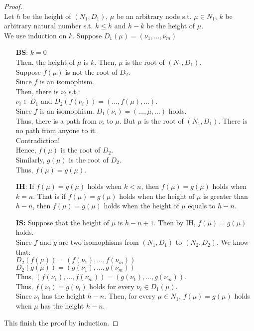 \documentclass[12pt,a4paper]{article}
\theoremstyle{plain}
\begin{document}
\begin{proof}\ \\
    Let $h$ be the height of $( N_1 , D_1 )$, $\mu$ be an arbitrary node s.t. $\mu \in N_1$, $k$ be arbitrary natural number s.t. $k \le h$ and $h - k$ be the height of $\mu$.\\
    We use induction on $k$. Suppose $D_1(\mu)=(\nu_1,...,\nu_m)$
    \begin{itemize}
        \item[\textbf{BS}:]
            $k=0$\\
            Then, the height of $\mu$ is $k$. Then, $\mu$ is the root of $(N_1,D_1)$.\\
            Suppose $f(\mu)$ is not the root of $D_2$.\\
            Since $f$ is an isomophism.\\
            Then, there is $\nu_i$ s.t.:\\
            $\nu_i \in D_1$ and 
            $D_2(f(\nu_i))=(...,f(\mu),...)$.\\ 
            Since $f$ is an isomophism. $D_1(\nu_i)=(...,\mu,...)$ holds.\\
            Thus, there is a path from $\nu_i$ to $\mu$.
            But $\mu$ is the root of $(N_1,D_1)$. There is no path from anyone to it.\\
            Contradiction!\\
            Hence, $f(\mu)$ is the root of $D_2$.\\
            Similarly, $g(\mu)$ is the root of $D_2$.\\
            Thus, $f(\mu)=g(\mu)$.
        \item[\textbf{IH}:]
            If $f(\mu)=g(\mu)$ holds when $k<n$, then $f(\mu)=g(\mu)$ holds when $k=n$. That is if $f(\mu)=g(\mu)$ holds when the height of $\mu$ is greater than $h-n$, then $f(\mu)=g(\mu)$ holds when the height of $\mu$ equals to $h-n$.
        \item[\textbf{IS:}]
            Suppose that the height of $\mu$ is $h-n+1$. Then by IH, $f(\mu)=g(\mu)$ holds.\\
            Since $f$ and $g$ are two isomophisms from $( N_1 , D_1 )$ to $( N_2 , D_2 )$. We know that:\\ 
            $D_2 ( f(\mu)) = ( f(\nu_1) , \dots , f(\nu_m) )$\\
            $D_2 ( g(\mu)) = ( g(\nu_1) , \dots , g(\nu_m) )$\\
            Thus, $( f(\nu_1) , \dots , f(\nu_m) )=( g(\nu_1) , \dots , g(\nu_m) )$.\\
            Thus, $f(\nu_i)=g(\nu_i)$ holds for every $\nu_i \in D_1(\mu)$.\\
            Since $\nu_i$ has the height $h-n$. Then, for every $\mu \in N_1$, $f(\mu)=g(\mu)$ holds when $\mu$ has the height $h-n$.
            
            
    \end{itemize}
    
This finish the proof by induction.   
\end{proof}

\end{document}
